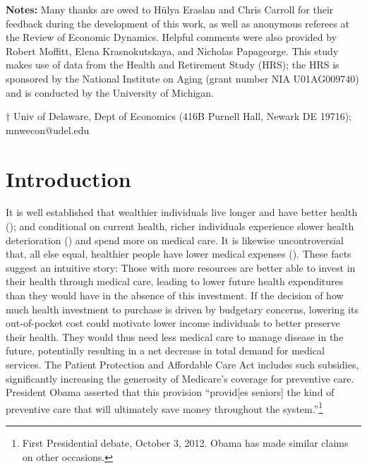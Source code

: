 \documentclass[12pt,pdftex,letterpaper]{article}
\begin{document}
\vspace{1cm}
\begin{singlespace}
\noindent \textbf{Notes:} Many thanks are owed to H\"{u}lya Eraslan and Chris Carroll for their feedback during the development of this work, as well as anonymous referees at the Review of Economic Dynamics.  Helpful comments were also provided by Robert Moffitt, Elena Krasnokutskaya, and Nicholas Papageorge.  This study makes use of data from the Health and Retirement Study (HRS); the HRS is sponsored by the National Institute on Aging (grant number NIA U01AG009740) and is conducted by the University of Michigan.

\vspace{1cm}

\small
\noindent $\dagger$ Univ of Delaware, Dept of Economics (416B Purnell Hall, Newark DE 19716);  mnwecon@udel.edu
\end{singlespace}

\thispagestyle{empty}
\newpage

\section{Introduction}
\label{sec:Intro}

It is well established that wealthier individuals live longer and have better health (\cite{deaton02}); and conditional on current health, richer individuals experience slower health deterioration (\cite{case03}) and spend more on medical care.  It is likewise uncontroversial that, all else equal, healthier people have lower medical expenses (\cite{thorpe04}).  These facts suggest an intuitive story: Those with more resources are better able to invest in their health through medical care, leading to lower future health expenditures than they would have in the absence of this investment.  If the decision of how much health investment to purchase is driven by budgetary concerns, lowering its out-of-pocket cost could motivate lower income individuals to better preserve their health.  They would thus need less medical care to manage disease in the future, potentially resulting in a net decrease in total demand for medical services.  The Patient Protection and Affordable Care Act includes such subsidies, significantly increasing the generosity of Medicare's coverage for preventive care.  President Obama asserted that this provision ``provid[es seniors] the kind of preventive care that will ultimately save money throughout the system.''\footnote{First Presidential debate, October 3, 2012.  Obama has made similar claims on other occasions.}
\end{document}
